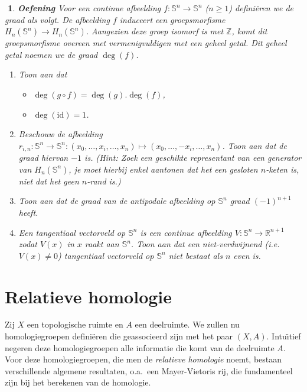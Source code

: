 \documentclass[12pt]{book}
\newtheorem{eoef}{$\!\!$}[chapter]
\newenvironment{oef}{\begin{eoef} {\bf Oefening}}{\end{eoef}}
\begin{document}
\begin{oef}
Voor een continue afbeelding $f: \mathbb{S}^n \to \mathbb{S}^n$ ($n \geq 1$) defini\"eren we de graad als volgt. De afbeelding $f$ induceert een groepsmorfisme $H_n(\mathbb{S}^n ) \to H_n(\mathbb{S}^n )$. Aangezien deze groep isomorf is met $\mathbb{Z}$, komt dit groepsmorfisme overeen met vermenigvuldigen met een geheel getal. Dit geheel getal noemen we de graad $\deg(f)$.
\begin{enumerate}
\item Toon aan dat 
\begin{itemize}
\item
$\deg(g \circ f) = \deg(g). \deg(f) $,
\item $\deg(\mathrm{id}) = 1 $.
\end{itemize}

\item
Beschouw de afbeelding $r_{i,n} : \mathbb{S}^n \to \mathbb{S}^n: (x_0, \dots, x_i, \dots, x_n) \mapsto (x_0, \dots, - x_i, \dots, x_n)$. Toon aan dat de graad hiervan $-1$ is. (Hint: Zoek een geschikte representant van een generator van $H_n(\mathbb{S}^n )$, je moet hierbij enkel aantonen dat het een gesloten $n$-keten is, niet dat het geen $n$-rand is.)

\item
Toon aan dat de graad van de antipodale afbeelding op $\mathbb{S}^n$ graad $(-1)^{n+1}$ heeft. 

\item
Een tangentiaal vectorveld op $\mathbb{S}^n$ is een continue afbeelding $V: \mathbb{S}^n \rightarrow \mathbb{R}^{n+1}$ zodat $V(x)$ in $x$ raakt aan $\mathbb{S}^n$. Toon aan dat een niet-verdwijnend (i.e. $V(x) \neq 0$) tangentiaal vectorveld op $\mathbb{S}^n$ niet  bestaat als $n$ even is.

\end{enumerate}
\end{oef}
\section{Relatieve homologie}

Zij $X$ een topologische ruimte en $A$ een deelruimte. We zullen nu homologiegroepen defini\"eren die geassocieerd zijn met het paar $(X,A)$.  Intu\"{\i}tief negeren deze homologiegroepen alle informatie die komt van de deelruimte $A$. Voor deze homologiegroepen, die men de {\em relatieve homologie} noemt, bestaan verschillende algemene resultaten, o.a.\ een Mayer-Vietoris rij, die fundamenteel zijn bij het berekenen van de homologie.
\end{document}
